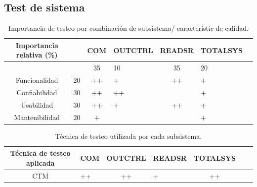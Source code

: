 \documentclass[11pt]{article}
\begin{document}
\subsection{Test de sistema}
\FloatBarrier
\begin{table}[!ht]
    \centering
    \begin{tabularx}{\linewidth}{@{}|c|X|c|X|c|X|c|@{}}\hline \hline
        \rowcolor[HTML]{d6c6c3}
        Importancia relativa (\%) &    & COM & OUTCTRL & READSR & TOTALSYS \\
        \hline

                                  &    & 35  & 10      & 35     & 20       \\
        Funcionalidad             & 20 & ++  & +       & ++     & +        \\
        Confiabilidad             & 30 & ++  & ++      &        & +        \\
        Usabilidad                & 30 & ++  & +       & ++     & +        \\
        Mantenibilidad            & 20 & +   &         &        & +        \\
        \hline
    \end{tabularx}
    \caption{Importancia de testeo por combinación de subsistema/ característic
        de calidad.}
\end{table}

\FloatBarrier
\begin{table}[!ht]
    \centering
    \begin{tabularx}{\linewidth}{@{}|c|X|c|X|c|X|c|@{}}\hline \hline
        \rowcolor[HTML]{d6c6c3}
        Técnica de testeo aplicada & COM & OUTCTRL & READSR & TOTALSYS \\
        \hline
        CTM                        & ++  & ++      & +      & ++       \\
        \hline
    \end{tabularx}
    \caption{Técnica de testeo utilizada por cada subsistema.}
\end{table}
\end{document}
